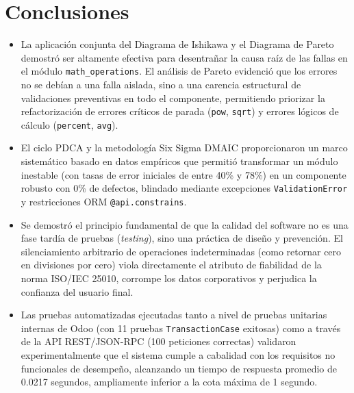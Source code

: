 \documentclass{article}
\begin{document}
\section{Conclusiones}
\begin{itemize}
    \item La aplicación conjunta del Diagrama de Ishikawa y el Diagrama de Pareto demostró ser altamente efectiva para desentrañar la causa raíz de las fallas en el módulo \texttt{math\_operations}. El análisis de Pareto evidenció que los errores no se debían a una falla aislada, sino a una carencia estructural de validaciones preventivas en todo el componente, permitiendo priorizar la refactorización de errores críticos de parada (\texttt{pow}, \texttt{sqrt}) y errores lógicos de cálculo (\texttt{percent}, \texttt{avg}).
    \item El ciclo PDCA y la metodología Six Sigma DMAIC proporcionaron un marco sistemático basado en datos empíricos que permitió transformar un módulo inestable (con tasas de error iniciales de entre 40\% y 78\%) en un componente robusto con 0\% de defectos, blindado mediante excepciones \texttt{ValidationError} y restricciones ORM \texttt{@api.constrains}.
    \item Se demostró el principio fundamental de que la calidad del software no es una fase tardía de pruebas (\textit{testing}), sino una práctica de diseño y prevención. El silenciamiento arbitrario de operaciones indeterminadas (como retornar cero en divisiones por cero) viola directamente el atributo de fiabilidad de la norma ISO/IEC 25010, corrompe los datos corporativos y perjudica la confianza del usuario final.
    \item Las pruebas automatizadas ejecutadas tanto a nivel de pruebas unitarias internas de Odoo (con 11 pruebas \texttt{TransactionCase} exitosas) como a través de la API REST/JSON-RPC (100 peticiones correctas) validaron experimentalmente que el sistema cumple a cabalidad con los requisitos no funcionales de desempeño, alcanzando un tiempo de respuesta promedio de 0.0217 segundos, ampliamente inferior a la cota máxima de 1 segundo.
\end{itemize}
\end{document}
